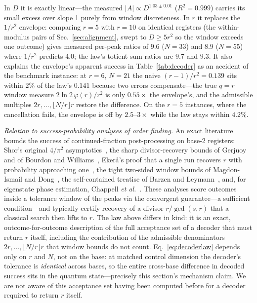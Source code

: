 \documentclass[aps,pra,reprint,superscriptaddress,nofootinbib,floatfix]{revtex4-2}
\begin{document}
In $D$ it is exactly linear---the measured $\lvert A\rvert\propto
D^{1.03\pm0.01}$ ($R^2=0.999$) carries its small excess over slope 1
purely from window discreteness. In $r$ it replaces the $1/r^2$
envelope: comparing $r=5$ with $r=10$ on identical registers (the
within-modulus pairs of Sec.~\ref{sec:alignment}, swept to $D\ge5r^2$
so the window exceeds one outcome) gives measured per-peak ratios of
$9.6$ ($N=33$) and $8.9$ ($N=55$) where $1/r^2$ predicts $4.0$; the
law's totient-sum ratios are $9.7$ and $9.3$. It also explains the
envelope's apparent success in Table~\ref{tab:decoder} as an accident
of the benchmark instance: at $r=6$, $N=21$ the naive $(r-1)/r^2=0.139$
sits within $2\%$ of the law's $0.141$ because two errors
compensate---the true $q=r$ window measure $2\ln2\,\varphi(r)/r^2$ is
only $0.55\times$ the envelope's, and the admissible multiples
$2r,\dots,\lfloor N/r\rfloor r$ restore the difference. On the $r=5$
instances, where the cancellation fails, the envelope is off by
$2.5$--$3\times$ while the law stays within $4.2\%$.

\emph{Relation to success-probability analyses of order finding.} An
exact literature bounds the success of continued-fraction
post-processing on base-2 registers: Shor's original $4/\pi^2$
asymptotics~\cite{shor1997}, the sharp divisor-recovery bounds of
Gerjuoy~\cite{gerjuoy2005} and of Bourdon and
Williams~\cite{bourdon2007}, Eker{\aa}'s proof that a single run
recovers $r$ with probability approaching one~\cite{ekera2024}, the
tight two-sided window bounds of Magdon-Ismail and
Dong~\cite{magdon2025}, the self-contained treatise of Barzen and
Leymann~\cite{barzen2022}, and, for eigenstate phase estimation,
Chappell \emph{et al.}~\cite{chappell2011}. These analyses score
outcomes inside a tolerance window of the peaks via the convergent
guarantee---a sufficient condition---and typically certify recovery
of a divisor $r/\gcd(s,r)$ that a classical search then lifts to $r$.
The law above differs in kind: it is an exact, outcome-for-outcome
description of the full acceptance set of a decoder that must return
$r$ itself, including the contribution of the admissible denominators
$2r,\dots,\lfloor N/r\rfloor r$ that window bounds do not count.
Eq.~\eqref{eq:decoderlaw} depends only on $r$ and $N$, not on the
base: at matched control dimension the decoder's tolerance is
\emph{identical} across bases, so the entire cross-base difference in
decoded success sits in the quantum state---precisely this section's
mechanism claim. We are not aware of this acceptance set having been
computed before for a decoder required to return $r$ itself.
\end{document}
